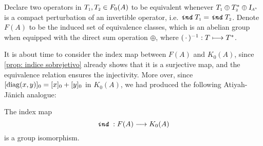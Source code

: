 Declare two operators in $\sub{T}{1}, \sub{T}{2} \in F_0(A)$ to be equivalent whenever $\sub{T}{1} \oplus \sub{T}{2}^* \oplus \sub\Id{A^n}$ is a compact perturbation of an invertible operator, i.e. $\ind \sub{T}{1} = \ind \sub{T}{2}$. Denote $F(A)$ to be the induced set of equivalence classes, which is an abelian group when equipped with the direct sum operation $\oplus$, where $(\operatorname{\,\cdot\,})^{-1}: T \longmapsto T^*$. 

It is about time to consider the index map between $F(A)$ and $K_0(A)$, since \ref{prop: indice sobrejetivo} already shows that it is a surjective map, and the equivalence relation ensures the injectivity. More over, since $[\operatorname{diag}(x,y)]_0 = [x]_0+[y]_0$ in $K_0(A)$, we had produced the following Atiyah-Jänich analogue:

\begin{corolario}\label{corol:atiyah-janich}
The index map 
$$
\texttt{\textit{ind}}\, : F(A) \longrightarrow K_0(A)
$$ 
is a group isomorphism.
\end{corolario}

